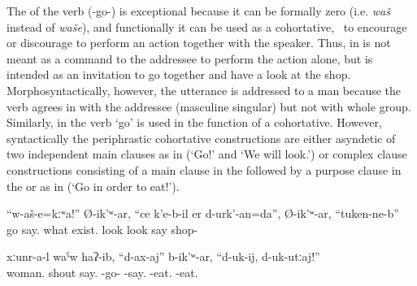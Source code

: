 The  of the verb  (-go-) is exceptional because it can be formally zero (i.e. \textit{waš} instead of \textit{waše}), and functionally it can be used as a cohortative, \tie\ to encourage or discourage to perform an action together with the speaker. Thus, in   is not meant as a command to the addressee to perform the action alone, but is intended as an invitation to go together and have a look at the shop. Morphosyntactically, however, the utterance is addressed to a man because the verb agrees in  with the addressee (masculine singular) but not with whole group. Similarly, in  the verb `go' is used in the function of a cohortative. However, syntactically the periphrastic cohortative constructions are either asyndetic  of two independent main clauses as in  (`Go!' and `We will look.') or complex clause constructions consisting of a main clause in the  followed by a purpose clause in the  or  as in  (`Go in order to eat!').
%
\begin{exe}
	\ex	\label{ex:‎Let's go (together) and look what is there in the shop}
	\gll	``w-aš-e=kːʷa!''	Ø-ik'ʷ-ar,	``ce	k'e-b-il	er	d-urk'-an=da'',	Ø-ik'ʷ-ar, ``tuken-ne-b''\\
		go		say.	what	exist.	look	look	say	shop-\\
	\glt	{}
	
			\ex	\label{ex:The women shouted ``Let's go eating!''}
		\gll	xːunr-a-l waˁw	haʔ-ib,	``d-ax-aj''	b-ik'ʷ-ar, ``d-uk-ij,	d-uk-utːaj!''\\
			woman. shout	say.	-go-	-say.	\tsc{1/2pl}-eat.	-eat.\\
		\glt	{} 
\end{exe}





